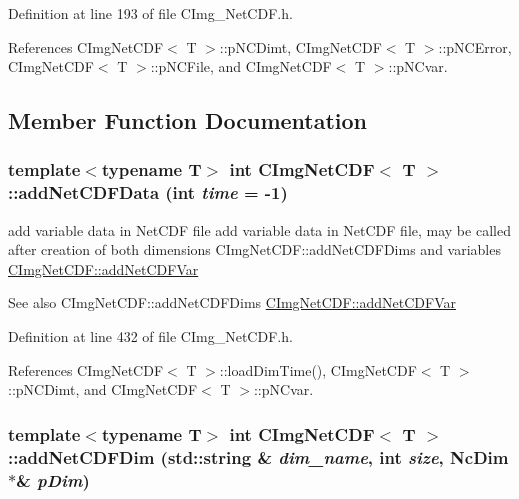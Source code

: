 \begin{DoxyCode}
\end{DoxyCode}
 

Definition at line 193 of file CImg\_\-NetCDF.h.

References CImgNetCDF$<$ T $>$::pNCDimt, CImgNetCDF$<$ T $>$::pNCError, CImgNetCDF$<$ T $>$::pNCFile, and CImgNetCDF$<$ T $>$::pNCvar.

\subsection{Member Function Documentation}
\hypertarget{classCImgNetCDF_a7399534c2d1d77f2a8faee47e888045a}{
\subsubsection[{addNetCDFData}]{\setlength{\rightskip}{0pt plus 5cm}template$<$typename T$>$ int {\bf CImgNetCDF}$<$ T $>$::addNetCDFData (int {\em time} = {\ttfamily -\/1})}}
\label{classCImgNetCDF_a7399534c2d1d77f2a8faee47e888045a}


add variable data in NetCDF file add variable data in NetCDF file, may be called after creation of both dimensions {\ttfamily CImgNetCDF::addNetCDFDims} and variables {\ttfamily \hyperlink{classCImgNetCDF_abae347b1449a8e6f65188ace2df5fee6}{CImgNetCDF::addNetCDFVar}} 


\begin{DoxyCode}
\end{DoxyCode}


\begin{DoxySeeAlso}{See also}
CImgNetCDF::addNetCDFDims \hyperlink{classCImgNetCDF_abae347b1449a8e6f65188ace2df5fee6}{CImgNetCDF::addNetCDFVar} 
\end{DoxySeeAlso}


Definition at line 432 of file CImg\_\-NetCDF.h.

References CImgNetCDF$<$ T $>$::loadDimTime(), CImgNetCDF$<$ T $>$::pNCDimt, and CImgNetCDF$<$ T $>$::pNCvar.\hypertarget{classCImgNetCDF_a62e321943bed9aaf068490170876aa97}{
\subsubsection[{addNetCDFDim}]{\setlength{\rightskip}{0pt plus 5cm}template$<$typename T$>$ int {\bf CImgNetCDF}$<$ T $>$::addNetCDFDim (std::string \& {\em dim\_\-name}, \/  int {\em size}, \/  NcDim $\ast$\& {\em pDim})}}
\label{classCImgNetCDF_a62e321943bed9aaf068490170876aa97}


